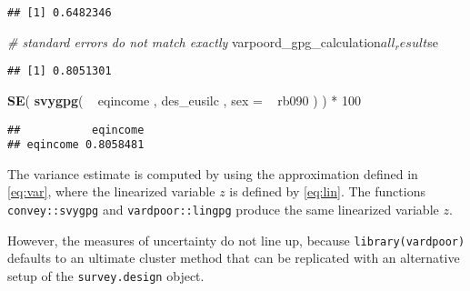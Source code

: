 \documentclass[]{book}
\newenvironment{Shaded}{\begin{snugshade}}{\end{snugshade}}
\newcommand{\KeywordTok}[1]{\textcolor[rgb]{0.13,0.29,0.53}{\textbf{{#1}}}}
\newcommand{\DataTypeTok}[1]{\textcolor[rgb]{0.13,0.29,0.53}{{#1}}}
\newcommand{\DecValTok}[1]{\textcolor[rgb]{0.00,0.00,0.81}{{#1}}}
\newcommand{\StringTok}[1]{\textcolor[rgb]{0.31,0.60,0.02}{{#1}}}
\newcommand{\CommentTok}[1]{\textcolor[rgb]{0.56,0.35,0.01}{\textit{{#1}}}}
\newcommand{\NormalTok}[1]{{#1}}
\begin{document}
\begin{verbatim}
## [1] 0.6482346
\end{verbatim}

\begin{Shaded}
\begin{Highlighting}[]
\CommentTok{# standard errors do not match exactly}
\NormalTok{varpoord_gpg_calculation$all_result$se}
\end{Highlighting}
\end{Shaded}

\begin{verbatim}
## [1] 0.8051301
\end{verbatim}

\begin{Shaded}
\begin{Highlighting}[]
\KeywordTok{SE}\NormalTok{( }\KeywordTok{svygpg}\NormalTok{( ~}\StringTok{ }\NormalTok{eqincome , des_eusilc , }\DataTypeTok{sex =} \NormalTok{~}\StringTok{ }\NormalTok{rb090 ) ) *}\StringTok{ }\DecValTok{100}
\end{Highlighting}
\end{Shaded}

\begin{verbatim}
##           eqincome
## eqincome 0.8058481
\end{verbatim}

The variance estimate is computed by using the approximation defined in
\eqref{eq:var}, where the linearized variable \(z\) is defined by
\eqref{eq:lin}. The functions \texttt{convey::svygpg} and
\texttt{vardpoor::lingpg} produce the same linearized variable \(z\).

However, the measures of uncertainty do not line up, because
\texttt{library(vardpoor)} defaults to an ultimate cluster method that
can be replicated with an alternative setup of the
\texttt{survey.design} object.
\end{document}
